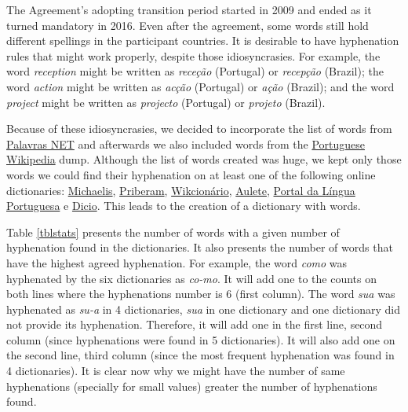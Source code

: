\documentclass{article}
\begin{document}
The Agreement's adopting transition period started in 2009 and ended as it
turned mandatory in 2016.  Even after the agreement, some words still hold
different spellings in the participant countries. It is desirable to have
hyphenation rules that might work properly, despite those idiosyncrasies.  For
example, the word \emph{reception} might be written as \emph{receção}
(Portugal) or \emph{recepção} (Brazil); the word \emph{action} might be written
as \emph{acção} (Portugal) or \emph{ação} (Brazil); and the word \emph{project}
might be written as \emph{projecto} (Portugal) or \emph{projeto} (Brazil).



Because of these idiosyncrasies, we decided to incorporate the list of words from
\href{https://www.palavras.net/}{Palavras NET} and afterwards we also included
words from the \href{https://pt.wikipedia.org}{Portuguese Wikipedia} dump.
Although the list of words created was huge, we kept only those words we could
find their hyphenation on at least one of the following online dictionaries: 
\href{https://michaelis.uol.com.br/}{Michaelis},
\href{https://dicionario.priberam.org/}{Priberam},
\href{https://pt.wiktionary.org}{Wikcionário},
\href{https://aulete.com.br/}{Aulete},
\href{http://www.portaldalinguaportuguesa.org/}{Portal da Língua Portuguesa} e
\href{https://www.dicio.com.br/}{Dicio}.
This leads to the creation of a dictionary with \DictionarySize{} words.

Table \ref{tblstats} presents the number of words with a given number of
hyphenation found in the dictionaries. It also presents the number of words
that have the highest agreed hyphenation. For example, the word \emph{como}
was hyphenated by the six dictionaries as \emph{co-mo}. It will add one to the
counts on both lines where the hyphenations number is 6 (first column). The
word \emph{sua} was hyphenated as \emph{su-a} in 4 dictionaries, \emph{sua} in
one dictionary and one dictionary did not provide its hyphenation. Therefore,
it will add one in the first line, second column (since hyphenations were found
in 5 dictionaries). It will also add one on the second line, third column
(since the most frequent hyphenation was found in 4 dictionaries). It is clear
now why we might have the number of same hyphenations (specially for small
values) greater the number of hyphenations found. 
\end{document}

